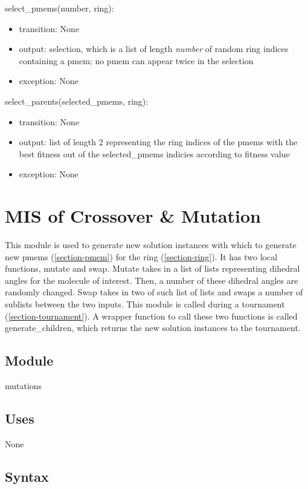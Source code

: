 \documentclass[12pt, titlepage]{article}
\begin{document}
\noindent select\_pmems(number, ring):
\begin{itemize}
	\item transition: None
	\item output: selection, which is a list of length \textit{number} of 
	random ring indices containing a pmem; no pmem can appear twice in the 
	selection
	\item exception: None
\end{itemize}

\noindent select\_parents(selected\_pmems, ring):
\begin{itemize}
	\item transition: None
	\item output: list of length 2 representing the ring indices of the pmems 
	with the best fitness out of the selected\_pmems indicies according to 
	fitness value
	\item exception: None
\end{itemize}

\newpage

\section{MIS of Crossover \& Mutation} \label{section-mutations}

This module is used to generate new solution instances with which to generate 
new pmems (\ref{section-pmem}) for the ring (\ref{section-ring}). It has two 
local functions, mutate and swap. Mutate takes in a list of lists representing 
dihedral angles for the molecule of interest. Then, a number of these dihedral 
angles are randomly changed. Swap takes in two of such list of lists and swaps 
a number of sublists between the two inputs. This module is called during a 
tournament (\ref{section-tournament}). A wrapper function to call these two 
functions is called generate\_children, which returns the new solution 
instances to the tournament.

\subsection{Module}

mutations

\subsection{Uses}

None

\subsection{Syntax}
\end{document}

